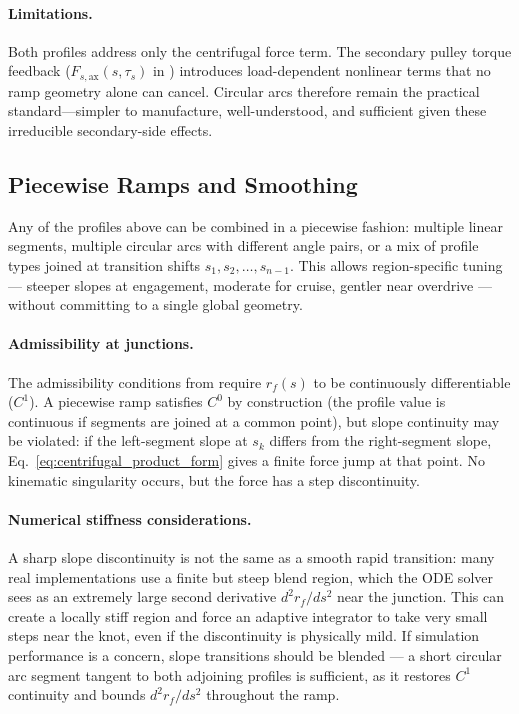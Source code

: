 \documentclass[11pt]{article}
\numberwithin{equation}{section}
\begin{document}
\paragraph{Limitations.}

Both profiles address only the centrifugal force term. The secondary pulley
torque feedback ($F_{s,\mathrm{ax}}(s,\tau_s)$ in )
introduces load-dependent nonlinear terms that no ramp geometry alone can
cancel. Circular arcs therefore remain the practical standard—simpler to
manufacture, well-understood, and sufficient given these irreducible
secondary-side effects.

\subsection{Piecewise Ramps and Smoothing}
\label{sec:ramp_piecewise}

Any of the profiles above can be combined in a piecewise fashion: multiple
linear segments, multiple circular arcs with different angle pairs, or a mix
of profile types joined at transition shifts $s_1, s_2, \ldots, s_{n-1}$.
This allows region-specific tuning — steeper slopes at engagement, moderate for
cruise, gentler near overdrive — without committing to a single global geometry.

\paragraph{Admissibility at junctions.}

The admissibility conditions from  require $r_f(s)$ to be
continuously differentiable ($C^1$). A piecewise ramp satisfies $C^0$ by
construction (the profile value is continuous if segments are joined at a common
point), but slope continuity may be violated: if the left-segment slope at
$s_k$ differs from the right-segment slope, Eq.~\eqref{eq:centrifugal_product_form}
gives a finite force jump at that point. No kinematic singularity occurs, but
the force has a step discontinuity.

\paragraph{Numerical stiffness considerations.}

A sharp slope discontinuity is not the same as a smooth rapid transition:
many real implementations use a finite but steep blend region, which the ODE
solver sees as an extremely large second derivative $d^2r_f/ds^2$ near the
junction. This can create a locally stiff region and force an adaptive
integrator to take very small steps near the knot, even if the discontinuity
is physically mild. If simulation performance is a concern, slope transitions
should be blended — a short circular arc segment tangent to both adjoining
profiles is sufficient, as it restores $C^1$ continuity and bounds $d^2r_f/ds^2$
throughout the ramp.
\end{document}
